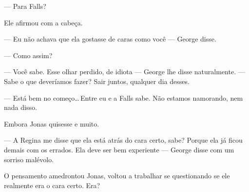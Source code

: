  --- Para Falls?

 Ele afirmou com a cabeça.

 --- Eu não achava que ela gostasse de caras como você --- George disse.

 --- Como assim?

 --- Você sabe. Esse olhar perdido, de idiota --- George lhe disse naturalmente. ---  Sabe o que deveríamos fazer? Sair juntos, qualquer dia desses.

 --- Está bem no começo\ldots\,Entre eu e a Falls sabe. Não estamos namorando, nem nada disso.

 Embora Jonas quisesse e muito.

 --- A Regina me disse que ela está atrás do cara certo, sabe? Porque ela já ficou demais com os errados. Ela deve ser bem experiente --- George disse com um sorriso malévolo.

 O pensamento amedrontou Jonas,  voltou a trabalhar\mudanca{,} se questionando se ele realmente era o cara certo. Era?
